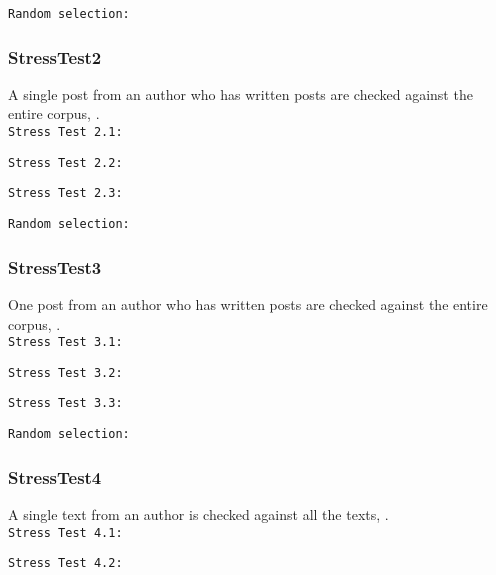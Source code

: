 \nl

\nl

\nl

\texttt{Random selection:}\nl


\subsubsection{StressTest2}
A single post from an author who has written  posts are checked against the entire corpus, .\\

\texttt{Stress Test 2.1:}\nl
\nl

\texttt{Stress Test 2.2:}\nl
\nl

\texttt{Stress Test 2.3:}\nl
\nl

\texttt{Random selection:}\nl


\subsubsection{StressTest3}
One post from an author who has written  posts are checked against the entire corpus, .\\

\texttt{Stress Test 3.1:}\nl
\nl

\texttt{Stress Test 3.2:}\nl
\nl

\texttt{Stress Test 3.3:}\nl
\nl

\texttt{Random selection:}\nl


\subsubsection{StressTest4}
A single text from an author is checked against all the texts,  .\\

\texttt{Stress Test 4.1:}\nl
\nl

\texttt{Stress Test 4.2:}\nl
\nl

